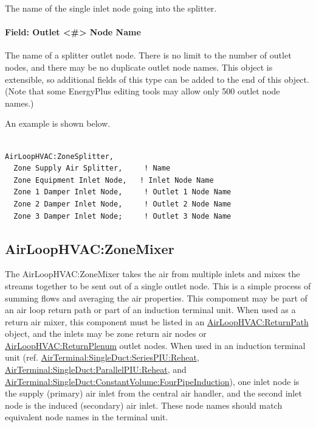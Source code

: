 The name of the single inlet node going into the splitter.

\paragraph{Field: Outlet \textless{}\#\textgreater{} Node Name}

The name of a splitter outlet node. There is no limit to the number of outlet nodes, and there may be no duplicate outlet node names.  This object is extensible, so additional fields of this type can be added to the end of this object.  (Note that some EnergyPlus editing tools may allow only 500 outlet node names.)

An example is shown below.

\begin{lstlisting}

AirLoopHVAC:ZoneSplitter,
  Zone Supply Air Splitter,     ! Name
  Zone Equipment Inlet Node,   ! Inlet Node Name
  Zone 1 Damper Inlet Node,     ! Outlet 1 Node Name
  Zone 2 Damper Inlet Node,     ! Outlet 2 Node Name
  Zone 3 Damper Inlet Node;     ! Outlet 3 Node Name
\end{lstlisting}

\subsection{AirLoopHVAC:ZoneMixer}\label{airloophvaczonemixer}

The AirLoopHVAC:ZoneMixer takes the air from multiple inlets and mixes the streams together to be sent out of a single outlet node. This is a simple process of summing flows and averaging the air properties. This compoment may be part of an air loop return path or part of an induction terminal unit. When used as a return air mixer, this component must be listed in an \hyperref[airloophvacreturnpath]{AirLoopHVAC:ReturnPath} object, and the inlets may be zone return air nodes or \hyperref[airloophvacreturnplenum]{AirLoopHVAC:ReturnPlenum} outlet nodes. When used in an induction terminal unit (ref. \hyperref[airterminalsingleductseriespiureheat]{AirTerminal:SingleDuct:SeriesPIU:Reheat}, \hyperref[airterminalsingleductparallelpiureheat]{AirTerminal:SingleDuct:ParallelPIU:Reheat}, and \hyperref[airterminalsingleductconstantvolumefourpipeinduction]{AirTerminal:SingleDuct:ConstantVolume:FourPipeInduction}), one inlet node is the supply (primary) air inlet from the central air handler, and the second inlet node is the induced (secondary) air inlet. These node names should match equivalent node names in the terminal unit.

